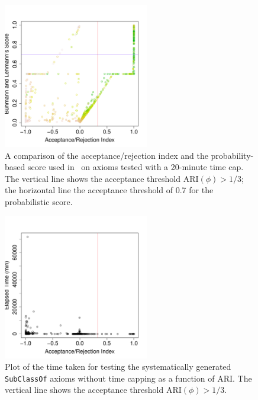 \documentclass[conference]{IEEEtran}
\begin{document}
\begin{figure}[t]
\begin{center}
    \includegraphics[height=2.5in]{ARI-BLS-20}
\end{center}
\caption{A comparison of the acceptance/rejection index and the probability-based
  score used in~\cite{BuehmannLehmann2012} on axioms tested with a 20-minute time cap.
  The vertical line shows the acceptance threshold $\mathrm{ARI}(\phi)>1/3$;
  the horizontal line the acceptance threshold of 0.7 for the probabilistic score.}
\label{fig:ARI-BLS-20}
\end{figure}


\begin{figure}[t]
\begin{center}
  \includegraphics[height=2.5in]{time-ARI}
\end{center}
\caption{Plot of the time taken for testing the systematically generated
 \texttt{SubClassOf} axioms without time capping as a function of ARI.
  The vertical line shows the acceptance threshold $\mathrm{ARI}(\phi)>1/3$.}
\label{fig:time-ARI}
\end{figure}

\end{document}
